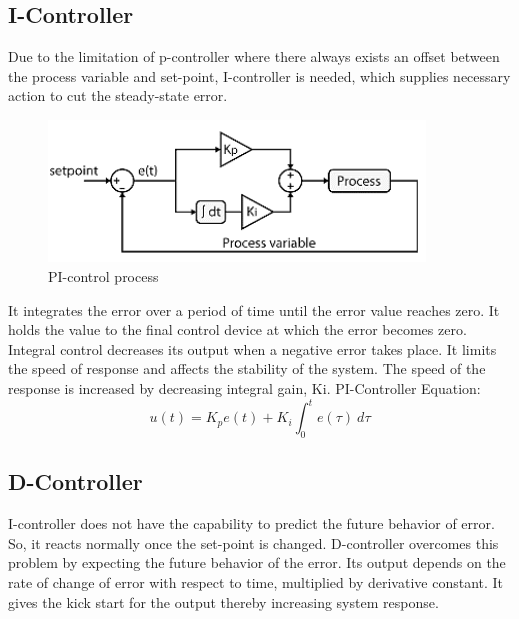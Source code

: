 \documentclass[12pt,a4paper]{book}
\begin{document}

\subsection{I-Controller}
Due to the limitation of p-controller where there always exists an offset between the process variable and set-point, I-controller is needed, which supplies necessary action to cut the steady-state error.

\begin{figure}[h]
  \centering
  \includegraphics[width=10cm]{image9.png}
  \caption{PI-control process}
  \label{fig:image9}
\end{figure}

It integrates the error over a period of time until the error value reaches zero. It holds the value to the final control device at which the error becomes zero. Integral control decreases its output when a negative error takes place. It limits the speed of response and affects the stability of the system. The speed of the response is increased by decreasing integral gain, Ki. PI-Controller Equation:
\begin{equation}
  u\left(t\right)=K_pe\left(t\right)+K_i\int_{0}^{t}{e\left(\tau\right)\ d\tau}
  \label{equation:eq2}
\end{equation}

\subsection{D-Controller}
I-controller does not have the capability to predict the future behavior of error. So, it reacts normally once the set-point is changed. D-controller overcomes this problem by expecting the future behavior of the error. Its output depends on the rate of change of error with respect to time, multiplied by derivative constant. It gives the kick start for the output thereby increasing system response.
\end{document}
